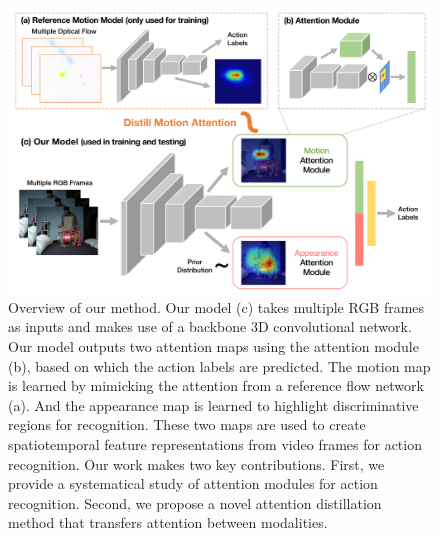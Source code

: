 \documentclass[10pt,twocolumn,letterpaper]{article}
\begin{document}
\begin{figure}[t]
\centering
\vspace{-0.2em}
\includegraphics[width=0.85\linewidth]{figures/overview.pdf}
\vspace{-0.2em}
\caption{Overview of our method. Our model (c) takes multiple RGB frames as inputs and makes use of a backbone 3D convolutional network. Our model outputs two attention maps using the attention module (b), based on which the action labels are predicted. The motion map is learned by mimicking the attention from a reference flow network (a). And the appearance map is learned to highlight discriminative regions for recognition. These two maps are used to create spatiotemporal feature representations from video frames for action recognition. Our work makes two key contributions. First, we provide a systematical study of attention modules for action recognition. Second, we propose a novel attention distillation method that transfers attention between modalities.} 
\label{fig:flowchart}
\vspace{-1.0em}
\end{figure}
\end{document}
